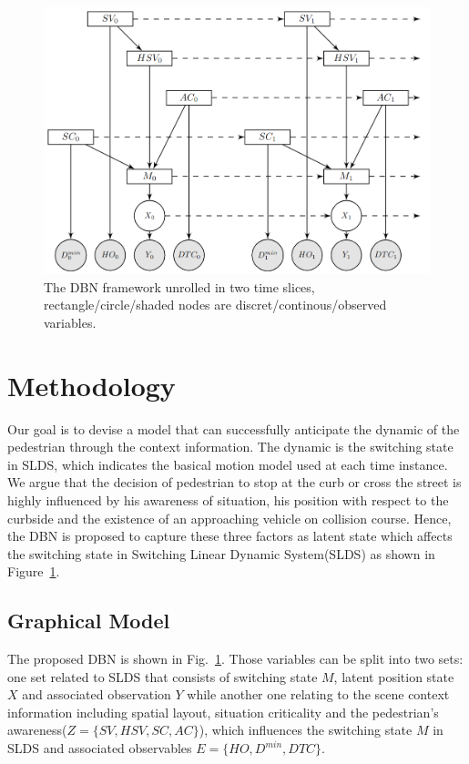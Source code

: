 \documentclass[10pt,twocolumn,letterpaper]{article}
\begin{document}
    \begin{figure}[t]
        \begin{center}
           \includegraphics[width=1.0\linewidth]{images/dbn.png}
        \end{center}
           \caption{The DBN framework unrolled in two time slices, rectangle/circle/shaded
           nodes are discret/continous/observed variables.}
        \label{fig:long}
        \label{fig:onecol}
        \label{dbn}
    \end{figure}
    

    \section{Methodology}
    Our goal is to devise a model that can successfully anticipate the dynamic of the 
    pedestrian through the context information. The dynamic is the switching state in
    SLDS, which indicates the basical motion model used at each time instance.
    We argue that the decision of pedestrian to stop at the curb or cross the street is 
    highly influenced by his awareness of situation, his position with respect to
    the curbside and the existence of an approaching vehicle on collision course. Hence, the 
    DBN is proposed to capture these three factors as latent state which affects the 
    switching state in Switching Linear Dynamic System(SLDS) as shown in Figure~\ref{dbn}. 

    \subsection{Graphical Model}
    The proposed DBN is shown in Fig.~\ref{dbn}. Those variables can be split into 
    two sets: one set related to SLDS that consists of switching state $M$, latent position
    state $X$ and associated observation $Y$ while another one relating to the scene 
    context information including spatial layout, situation criticality
    and the pedestrian's awareness($Z = \{SV, HSV, SC, AC\}$), which influences the switching
    state $M$ in SLDS and associated observables $E=\{HO, D^{min}, DTC\}$. \\
\end{document}
